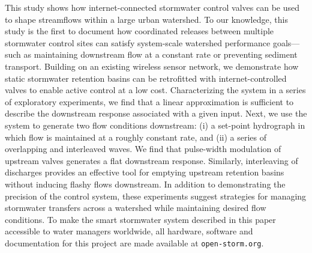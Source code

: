 This study shows how internet-connected stormwater control valves can be used to shape streamflows within a large urban watershed. To our knowledge, this study is the first to document how coordinated releases between multiple stormwater control sites can satisfy system-scale watershed performance goals---such as maintaining downstream flow at a constant rate or preventing sediment transport. Building on an existing wireless sensor network, we demonstrate how static stormwater retention basins can be retrofitted with internet-controlled valves to enable active control at a low cost. 
Characterizing the system in a series of exploratory experiments,
we find that a linear approximation is sufficient to describe the downstream response associated with a given input. Next, we use the system to generate two flow conditions downstream: (i) a set-point hydrograph in which flow is maintained at a roughly constant rate, and (ii) a series of overlapping and interleaved waves. We find that pulse-width modulation of upstream valves generates a flat downstream response. Similarly, interleaving of discharges provides an effective tool for emptying upstream retention basins without inducing flashy flows downstream. In addition to demonstrating the precision of the control system, these experiments suggest strategies for managing stormwater transfers across a watershed while maintaining desired flow conditions. To make the smart stormwater system described in this paper accessible to water managers worldwide, all hardware, software and documentation for this project are made available at \texttt{open-storm.org}. 

